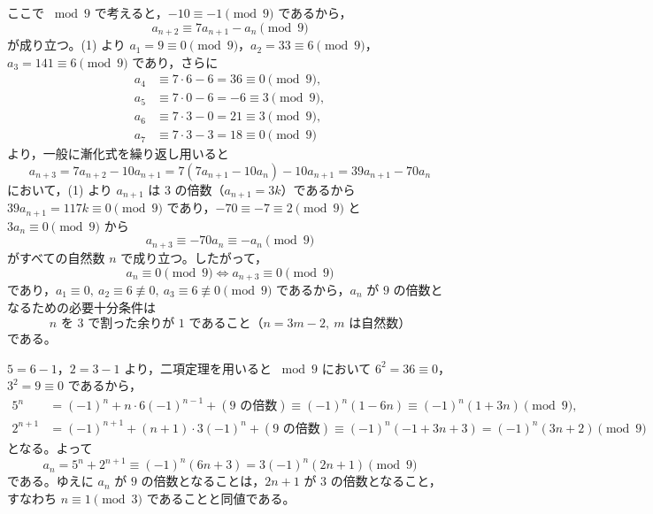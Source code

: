 ここで $\bmod 9$ で考えると，$-10\equiv -1\pmod{9}$ であるから，
\[
  a_{n+2} \equiv 7a_{n+1} - a_{n} \pmod{9}
\]
が成り立つ。(1) より $a_{1}=9\equiv 0\pmod{9}$，$a_{2}=33\equiv 6\pmod{9}$，$a_{3}=141\equiv 6\pmod{9}$ であり，さらに
\begin{align*}
  a_{4} &\equiv 7\cdot 6 - 6 = 36 \equiv 0 \pmod{9},\\
  a_{5} &\equiv 7\cdot 0 - 6 = -6 \equiv 3 \pmod{9},\\
  a_{6} &\equiv 7\cdot 3 - 0 = 21 \equiv 3 \pmod{9},\\
  a_{7} &\equiv 7\cdot 3 - 3 = 18 \equiv 0 \pmod{9}
\end{align*}
より，一般に漸化式を繰り返し用いると
\[
  a_{n+3} = 7a_{n+2}-10a_{n+1} = 7(7a_{n+1}-10a_{n})-10a_{n+1} = 39a_{n+1}-70a_{n}
\]
において，(1) より $a_{n+1}$ は $3$ の倍数（$a_{n+1}=3k$）であるから $39a_{n+1}=117k\equiv 0\pmod{9}$ であり，$-70\equiv -7\equiv 2\pmod{9}$ と $3a_{n}\equiv 0\pmod{9}$ から
\[
  a_{n+3} \equiv -70a_{n} \equiv -a_{n} \pmod{9}
\]
がすべての自然数 $n$ で成り立つ。したがって，
\[
  a_{n}\equiv 0\pmod{9} \iff a_{n+3}\equiv 0\pmod{9}
\]
であり，$a_{1}\equiv 0,\ a_{2}\equiv 6\not\equiv 0,\ a_{3}\equiv 6\not\equiv 0\pmod{9}$ であるから，$a_{n}$ が $9$ の倍数となるための必要十分条件は
\[
  n\text{ を }3\text{ で割った余りが }1\text{ であること（}n=3m-2,\ m\text{ は自然数）}
\]
である。

\begin{betsu}
$5=6-1$，$2=3-1$ より，二項定理を用いると $\bmod 9$ において $6^{2}=36\equiv 0$，$3^{2}=9\equiv 0$ であるから，
\begin{align*}
  5^{n} &= (-1)^{n} + n\cdot 6(-1)^{n-1} + (\text{$9$ の倍数}) \equiv (-1)^{n}(1-6n) \equiv (-1)^{n}(1+3n) \pmod{9},\\
  2^{n+1} &= (-1)^{n+1} + (n+1)\cdot 3(-1)^{n} + (\text{$9$ の倍数}) \equiv (-1)^{n}(-1+3n+3) = (-1)^{n}(3n+2) \pmod{9}
\end{align*}
となる。よって
\[
  a_{n} = 5^{n} + 2^{n+1} \equiv (-1)^{n}(6n+3) = 3(-1)^{n}(2n+1) \pmod{9}
\]
である。ゆえに $a_{n}$ が $9$ の倍数となることは，$2n+1$ が $3$ の倍数となること，すなわち $n\equiv 1\pmod{3}$ であることと同値である。
\end{betsu}


